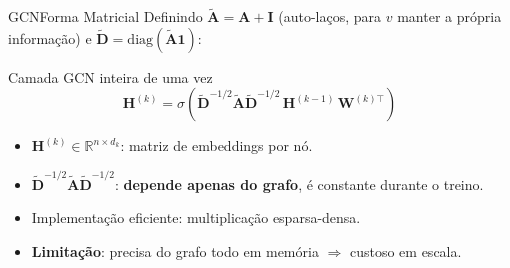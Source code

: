 \documentclass[aspectratio=169,xcolor=dvipsnames]{beamer}
\begin{document}
  \begin{frame}{GCN}{Forma Matricial}
    Definindo $\tilde{\mathbf{A}} = \mathbf{A} + \mathbf{I}$ (auto-laços, para $v$ manter a própria informação) e $\tilde{\mathbf{D}} = \mathrm{diag}(\tilde{\mathbf{A}} \mathbf{1})$:

    \vspace{0.4em}
    \begin{block}{Camada GCN inteira de uma vez}
      \[
        \mathbf{H}^{(k)} = \sigma\!\left(
          \tilde{\mathbf{D}}^{-1/2} \tilde{\mathbf{A}} \tilde{\mathbf{D}}^{-1/2}\, \mathbf{H}^{(k-1)}\, \mathbf{W}^{(k)\top}
        \right)
      \]
    \end{block}

    \vspace{0.5em}
    \begin{itemize}
      \item $\mathbf{H}^{(k)} \in \mathbb{R}^{n \times d_k}$: matriz de embeddings por nó.
      \item $\tilde{\mathbf{D}}^{-1/2} \tilde{\mathbf{A}} \tilde{\mathbf{D}}^{-1/2}$: \textbf{depende apenas
            do grafo}, é constante durante o treino.
      \item Implementação eficiente: multiplicação esparsa-densa.
      \item \textbf{Limitação}: precisa do grafo todo em memória $\Rightarrow$
            custoso em escala.
    \end{itemize}
  \end{frame}
\end{document}
